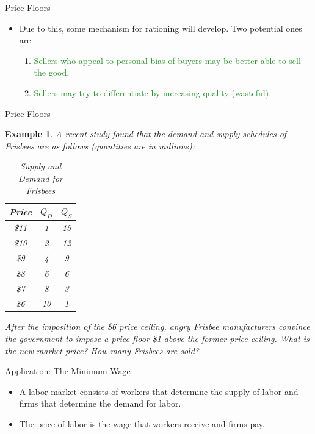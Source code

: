 \documentclass[xcolor={dvipsnames},pdf, hyperref={colorlinks=true, citecolor=ForestGreen, linkcolor=BlueViolet, urlcolor=Magenta}]{beamer}
\newtheorem{exmp}{Example}[section]
\newcommand{\ddp}[1]{{\textcolor{ForestGreen}{#1}}}
\begin{document}
\begin{frame}{Price Floors}
	\begin{itemize}
		\item 	Due to this, some mechanism for rationing will develop. Two potential ones are
		\begin{enumerate}
			\item \ddp{Sellers who appeal to personal bias of buyers may be better able to sell the good.}
			\item \ddp{Sellers may try to differentiate by increasing quality (wasteful).}
		\end{enumerate}
	\end{itemize}
\end{frame}

\begin{frame}{Price Floors}
	\begin{exmp}
		\scriptsize
		A recent study found that the demand and supply schedules of Frisbees are as follows (quantities are in millions):
		\begin{table}[H]
			\caption{Supply and Demand for Frisbees}
			
			\centering
			\begin{tabular}{ c|c|c}        
				Price   & $Q_D$ & $Q_S$\\
				\hline
				\$11 & 1 & 15 \\
				\$10 & 2 & 12 \\
				\$9 & 4 & 9 \\
				\$8 & 6 & 6 \\
				\$7 & 8 & 3 \\
				\$6 & 10 & 1 \\
			\end{tabular}
		\end{table} 
	 After the imposition of the \$6 price ceiling, angry Frisbee manufacturers convince the government to impose a price floor \$1 above the former price ceiling. What is the new market price? How many Frisbees are sold? \pause \ddp{The price floor is not binding. $(P^*,Q^*) = (\$8, 6)$}
	\end{exmp}
\end{frame}


\begin{frame}{Application: The Minimum Wage}
	\begin{itemize}
		\item A labor market consists of workers that determine the supply of labor and firms that determine the demand for labor. 
		\item The price of labor is the wage that workers receive and firms pay. 
	\end{itemize}
\end{frame}
\end{document}
